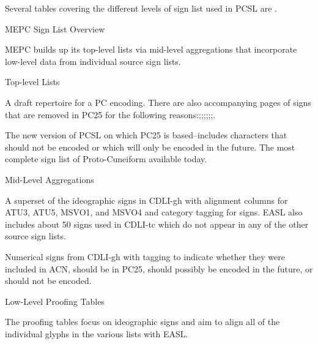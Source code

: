 \par Several tables covering the different levels of sign list
      used in PCSL are .

\Hh{}MEPC Sign List Overview


\par MEPC builds up its top-level lists via mid-level aggregations
    that incorporate low-level data from individual source sign
    lists.

\Hhh{}Top-level Lists

\Hdl\Hdt{}

{}A draft repertoire for a PC encoding. There are also
      accompanying pages of signs that are removed in PC25 for the
      following reasons:;;;;;;.

\Hdt{}

{}The new version of PCSL on which PC25 is based--includes
      characters that should not be encoded or which will only be
      encoded in the future.  The most complete sign list of
      Proto-Cuneiform available today.

\Henddl
\Hhh{}Mid-Level Aggregations

\Hdl\Hdt{}

{}A superset of the ideographic signs in CDLI-gh with
      alignment columns for ATU3, ATU5, MSVO1, and MSVO4 and category
      tagging for signs.  EASL also includes about 50 signs used in
      CDLI-tc which do not appear in any of the other source sign
      lists.

\Hdt{}

{}Numerical signs from CDLI-gh with tagging to indicate
      whether they were included in ACN, should be in PC25, should
      possibly be encoded in the future, or should not be
      encoded.

\Henddl
\Hhh{}Low-Level Proofing Tables


\par The proofing tables focus on ideographic signs and aim to align
    all of the individual glyphs in the various lists with EASL.

